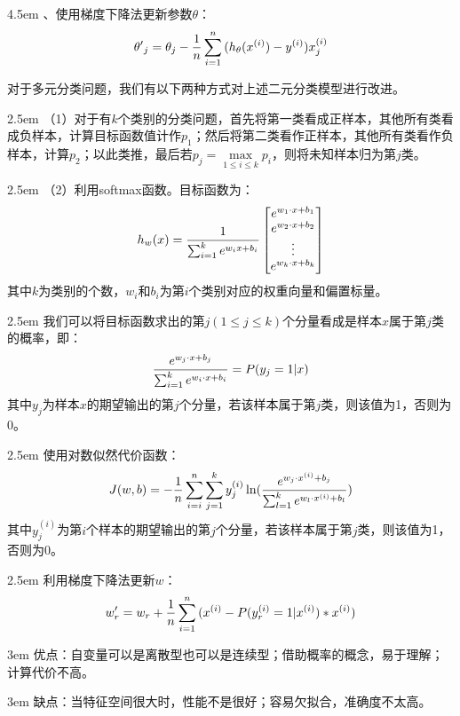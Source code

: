 \documentclass[a4paper, 11pt]{article}
\begin{document}
\begin{CJK*}{GBK}{song}
\hangindent 4.5em
\quad\quad{}、使用梯度下降法更新参数$\theta$：
$${{\theta '}_j} = {\theta _j} - {1 \over n}\sum\limits_{i = 1}^n {({h_\theta }({x^{(i)}}) - {y^{(i)}})} x_j^{(i)}$$

\quad\quad
对于多元分类问题，我们有以下两种方式对上述二元分类模型进行改进。

\hangindent 2.5em
（1）对于有$k$个类别的分类问题，首先将第一类看成正样本，其他所有类看成负样本，计算目标函数值计作$p_1$；然后将第二类看作正样本，其他所有类看作负样本，计算$p_2$；以此类推，最后若${p_j} = \mathop {\max }\limits_{1 \le i \le k} {p_i}$，则将未知样本归为第$j$类。

\hangindent 2.5em
（2）利用softmax函数。目标函数为：
$${h_w}(x) = {1 \over {\sum\nolimits_{i = 1}^k {{e^{{w_i}x + {b_i}}}} }}
\left[\begin{matrix}
e^{{w_1} \cdot x + {b_1}}\\
e^{{w_2} \cdot x + {b_2}}\\
\vdots\\
e^{{w_k} \cdot x + {b_k}}
\end{matrix}\right]
$$
其中$k$为类别的个数，${w_i}$和$b_i$为第$i$个类别对应的权重向量和偏置标量。

\hangindent 2.5em
我们可以将目标函数求出的第$j(1 \le j \le k)$个分量看成是样本$x$属于第$j$类的概率，即：
$${{{e^{{w_j} \cdot x + {b_j}}}} \over {\sum\nolimits_{i = 1}^k {{e^{{w_i} \cdot x + {b_i}}}} }} = P({y_j} = 1|x)$$
其中${y_j}$为样本$x$的期望输出的第$j$个分量，若该样本属于第$j$类，则该值为1，否则为0。

\hangindent 2.5em
使用对数似然代价函数：
$$J(w,b) =  - {1 \over n}\sum\limits_{i = i}^n {\sum\limits_{j = 1}^k {y_j^{(i)}\ln } } ({{{e^{{w_j}\cdot{x^{(i)}} + {b_j}}}} \over {\sum\nolimits_{l = 1}^k {{e^{{w_l}\cdot{x^{(i)}} + {b_l}}}} }})$$
其中${y_j^{(i)}}$为第$i$个样本的期望输出的第$j$个分量，若该样本属于第$j$类，则该值为1，否则为0。

\hangindent 2.5em
利用梯度下降法更新$w$：
$${w'_r} = {w_r} + {1 \over n}\sum\limits_{i = 1}^n {({x^{(i)}} - P(y_r^{(i)} = 1|{x^{(i)}})*{x^{(i)}})} $$

\hangindent 3em
优点：自变量可以是离散型也可以是连续型；借助概率的概念，易于理解；计算代价不高。

\hangindent 3em
缺点：当特征空间很大时，性能不是很好；容易欠拟合，准确度不太高。
\end{CJK*}
\end{document}
